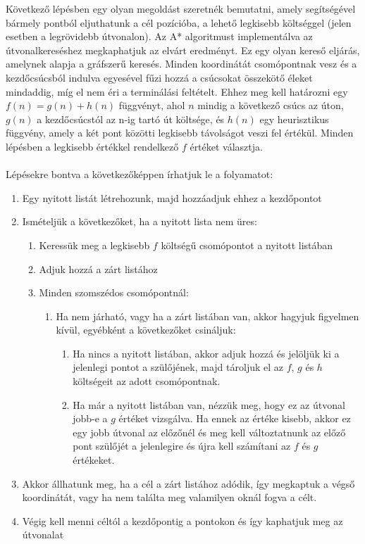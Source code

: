 Következő lépésben egy olyan megoldást szeretnék bemutatni, amely segítségével bármely pontból eljuthatunk a cél pozícióba, a lehető legkisebb költséggel (jelen esetben a legrövidebb útvonalon).
Az A* algoritmust implementálva az útvonalkereséshez megkaphatjuk az elvárt eredményt. Ez egy olyan kereső eljárás, amelynek alapja a gráfszerű keresés. Minden koordinátát csomópontnak vesz és a kezdőcsúcsból indulva egyesével fűzi hozzá a csúcsokat összekötő éleket mindaddig, míg el nem éri a terminálási feltételt. Ehhez meg kell határozni egy $ f(n) = g(n) + h(n) $ függvényt, ahol $ n $ mindig a következő csúcs az úton, $ g(n) $ a kezdőcsúcstól az n-ig tartó út költsége, és $ h(n) $ egy heurisztikus függvény, amely a két pont közötti legkisebb távolságot veszi fel értékül. Minden lépésben a legkisebb értékkel rendelkező $ f $ értéket választja.
\\\\
Lépésekre bontva a következőképpen írhatjuk le a folyamatot:

\begin{enumerate}
	\item Egy nyitott listát létrehozunk, majd hozzáadjuk ehhez a kezdőpontot
	\item Ismételjük a következőket, ha a nyitott lista nem üres:
	\begin{enumerate}
		\item Keressük meg a legkisebb $ f $ költségű csomópontot a nyitott listában
		\item Adjuk hozzá a zárt listához
		\item Minden szomszédos csomópontnál:
			\begin{enumerate}
				\item Ha nem járható, vagy ha a zárt listában van, akkor hagyjuk figyelmen kívül, egyébként a következőket csináljuk:
					\begin{enumerate}
						\item Ha nincs a nyitott listában, akkor adjuk hozzá és jelöljük ki a jelenlegi pontot a szülőjének, majd tároljuk el az $ f $, $ g $ és $ h $ költségeit az adott csomópontnak.
						\item Ha már a nyitott listában van, nézzük meg, hogy ez az útvonal jobb-e a $ g $ értéket vizsgálva. Ha ennek az értéke kisebb, akkor ez egy jobb útvonal az előzőnél és meg kell változtatnunk az előző pont szülőjét a jelenlegire és újra kell számítani az $ f $ és $ g $ értékeket.  
					\end{enumerate}
			\end{enumerate}
	\end{enumerate}
	\item Akkor állhatunk meg, ha a cél a zárt listához adódik, így megkaptuk a végső koordinátát, vagy ha nem találta meg valamilyen oknál fogva a célt. 
	\item Végig kell menni céltól a kezdőpontig a pontokon és így kaphatjuk meg az útvonalat
\end{enumerate}

